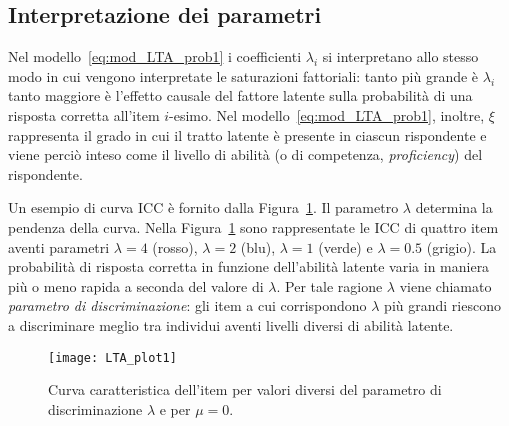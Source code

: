 %

\subsection{Interpretazione dei parametri}\label{cap:interpr_par_irt}

Nel modello~\ref{eq:mod_LTA_prob1} i coefficienti $\lambda_{i}$ si interpretano allo stesso modo in cui vengono interpretate le saturazioni fattoriali: tanto più grande è $\lambda_{i}$ tanto maggiore è l'effetto causale del fattore latente sulla probabilità di una risposta corretta all'item $i$-esimo. 
Nel modello~\ref{eq:mod_LTA_prob1}, inoltre, $\xi$ rappresenta il grado in cui il tratto latente è presente in ciascun rispondente e viene perciò inteso come il livello di abilità (o di competenza, \textit{proficiency}) del rispondente. 

Un esempio di curva ICC è fornito dalla Figura~\ref{fig:LTA_plot1}. 
Il parametro $\lambda$ determina la pendenza della curva. 
Nella Figura~\ref{fig:LTA_plot1} sono rappresentate le ICC di quattro item aventi parametri $\lambda=4$ (rosso), $\lambda=2$ (blu), $\lambda=1$ (verde) e $\lambda=0.5$ (grigio).  
La probabilità di risposta corretta in funzione dell'abilità latente varia in maniera più o meno rapida a seconda del valore di $\lambda$. 
Per tale ragione $\lambda$ viene chiamato \emph{parametro di discriminazione}: gli item a cui corrispondono $\lambda$ più grandi riescono a discriminare meglio tra individui aventi livelli diversi di abilità latente.

\begin{figure}
  \begin{center}
    \texttt{[image: LTA\_plot1]}
    \caption{Curva caratteristica dell'item per valori diversi del parametro di discriminazione $\lambda$ e per $\mu=0$.}
    \label{fig:LTA_plot1}
  \end{center}
\end{figure}

